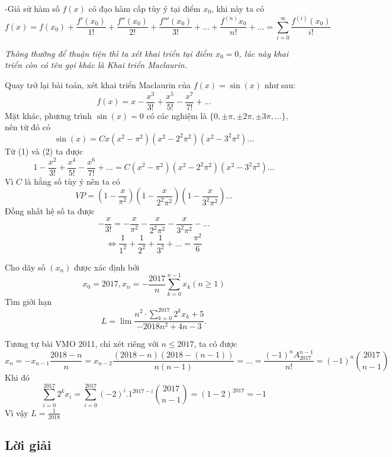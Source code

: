 \documentclass[11pt]{scrartcl}
\begin{document}
\begin{itemize}[label=, leftmargin=0em, itemsep=0.5em]
\begin{sol}
        \begin{theo}
            -Giả sử hàm số $f(x)$ có đạo hàm cấp tùy ý tại điểm $x_0$, khi này ta có 
            \[f(x) = f(x_0) + \frac{f'(x_0)}{1!} + \frac{f''(x_0)}{2!} + \frac{f'''(x_0)}{3!} + ... + \frac{f^{(n)}x_0}{n!} + ...= \sum_{i = 0}^{\infty} \frac{f^{(i)}(x_0)}{i!} \]
        \end{theo}
        \textit{Thông thường để thuận tiện thì ta xét khai triển tại điểm $x_0 = 0$, lúc này khai triển còn có tên gọi khác là Khai triển Maclaurin.}


        Quay trở lại bài toán, xét khai triển Maclaurin của $f(x) = \sin(x)$ như sau:
        \[
        f(x) = x - \frac{x^3}{3!} + \frac{x^5}{5!} - \frac{x^7}{7!} + ...\tag{1}
        \]
        Mặt khác, phương trình $\sin(x) = 0$ có các nghiệm là $\{0 , \pm \pi, \pm 2\pi,\pm 3\pi,...\}$, nên từ đó có
        \[\sin(x) = Cx(x^2 - \pi^2)(x^2 - 2^2\pi^2)(x^2 - 3^2\pi^2)... \tag{2}\]
        Từ (1) và (2) ta được   
        \[1 - \frac{x^2}{3!} + \frac{x^4}{5!} - \frac{x^6}{7!} + ... = C(x^2 - \pi^2)(x^2 - 2^2\pi^2)(x^2 - 3^2\pi^2)...
        \] Vì $C$ là hằng số tùy ý nên ta có 
        \[VP = (1 - \frac{x}{\pi^2})(1 - \frac{x}{2^2\pi^2})(1 - \frac{x}{3^2\pi^2})...\]
        Đồng nhất hệ số ta được
        \[-\frac{x}{3!} =-\frac{x}{\pi^2} -\frac{x}{2^2\pi^2} -\frac{x}{3^2\pi^2} -...\]
        \[\Leftrightarrow \frac{1}{1^2} + \frac{1}{2^2} + \frac{1}{3^2} + ... = \frac{\pi^2}{6}\]
    \end{sol}
        \begin{bt}
            Cho dãy số $\left(x_n\right)$ được xác định bởi $$x_0=2017, x_n=-\frac{2017}{n} \sum_{k=0}^{n-1} x_k(n \geq 1)$$ Tìm giới hạn
\[
L=\lim \frac{n^2 \cdot\displaystyle \sum_{k=0}^{2017} 2^k x_k+5}{-2018 n^2+4 n-3} .
\]
        \end{bt}
        \begin{sol}
        Tương tự bài VMO 2011, chỉ xét riêng với $n \leq 2017$, ta có được
        \[
        x_{n} = -x_{n - 1} \frac{2018 - n}{n} = x_{n -2} \frac{(2018 - n)(2018 -(n - 1))}{n(n -1)} = ... = \frac{(-1)^nA_{2017}^{n - 1}}{n!} = (-1)^n \binom{2017}{n - 1}
        \]
        Khi đó 
        \[
            \displaystyle \sum_{i=0}^{2017} 2^k x_i = \displaystyle \sum_{i=0}^{2017} (-2)^i .1^{2017 - i}\binom{2017}{n - 1} = (1 - 2)^{2017} = -1
        \]
        Vì vậy $L = \frac{1}{2018}$
        \end{sol}
        \subsection{\LARGE \textcolor{dk}{Lời giải}}
    \newpage
    \thispagestyle{plain}
    

\end{itemize}
\end{document}
